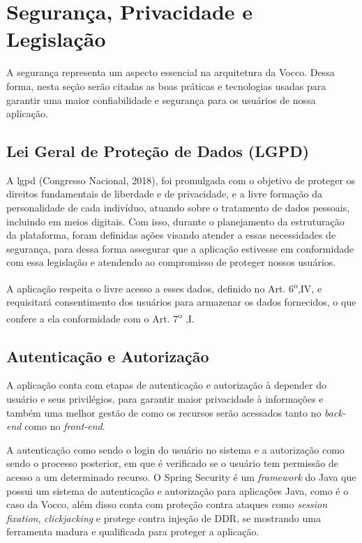 \section{Segurança, Privacidade e Legislação}
A segurança representa um aspecto essencial na arquitetura da Vocco. Dessa forma, nesta seção serão citadas as boas práticas e tecnologias usadas para garantir uma maior confiabilidade e segurança para os usuários de nossa aplicação.

\subsection{Lei Geral de Proteção de Dados (LGPD)}
A \ac{lgpd} (Congresso Nacional, 2018), foi promulgada com o objetivo de proteger os direitos fundamentais de liberdade e de privacidade, e a livre formação da personalidade de cada indivíduo, atuando sobre o tratamento de dados pessoais, incluindo em meios digitais.
Com isso, durante o planejamento da estruturação da plataforma, foram definidas ações visando atender a essas necessidades de segurança, para dessa forma assegurar que a aplicação estivesse em conformidade com essa legislação e atendendo ao compromisso de proteger nossos usuários.

A aplicação respeita o livre acesso a esses dados, definido no Art. 6\textsuperscript{o},IV, e requisitará consentimento dos usuários para armazenar os dados fornecidos, o que confere a ela conformidade com o Art. 7\textsuperscript{o}
,I.


\subsection{Autenticação e Autorização}
A aplicação conta com etapas de autenticação e autorização à depender do usuário e seus privilégios, para garantir maior privacidade à informações e também uma melhor gestão de como os recursos serão acessados tanto no \textit{back-end} como no \textit{front-end}.

A autenticação como sendo o login do usuário no sistema e a autorização como sendo o processo posterior, em que é verificado se o usuário tem permissão de acesso a um determinado recurso.
O Spring Security é um \textit{framework} do Java que possui um sistema  de autenticação e autorização para aplicações Java, como é o caso da Vocco, além disso conta com proteção contra ataques como \textit{session fixation}, \textit{clickjacking} e protege contra injeção de DDR, se mostrando uma ferramenta madura e qualificada para proteger a aplicação.

